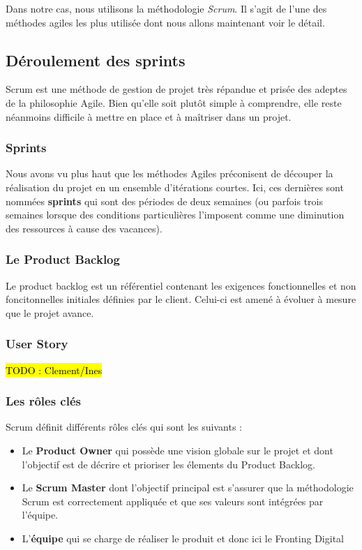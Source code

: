 	Dans notre cas, nous utilisons la méthodologie \textit{Scrum}. Il s'agit de l'une des méthodes agiles les plus utilisée dont nous allons maintenant voir le détail.

\subsection{Déroulement des sprints}

	Scrum est une méthode de gestion de projet très répandue et prisée des adeptes de la philosophie Agile. Bien qu'elle soit plutôt simple à comprendre, elle reste néanmoins difficile à mettre en place et à maîtriser dans un projet. \\
	
	\subsubsection{Sprints}
	Nous avons vu plus haut que les méthodes Agiles préconisent de découper la réalisation du projet en un ensemble d'itérations courtes. Ici, ces dernières sont nommées \textbf{sprints} qui sont des périodes de deux semaines (ou parfois trois semaines lorsque des conditions particulières l'imposent comme une diminution des ressources à cause des vacances).
	
	\subsubsection{Le Product Backlog}
	Le product backlog est un référentiel contenant les exigences fonctionnelles et non foncitonnelles initiales définies par le client. Celui-ci est amené à évoluer à mesure que le projet avance.
	
	\subsubsection{User Story}
	\hl{TODO : Clement/Ines}
	
	\subsubsection{Les rôles clés}
	Scrum définit différents rôles clés qui sont les suivants :
	\begin{itemize}
		\item Le \textbf{Product Owner} qui possède une vision globale sur le projet et dont l'objectif est de décrire et prioriser les élements du Product Backlog.
		\item Le \textbf{Scrum Master} dont l'objectif principal est s'assurer que la méthodologie Scrum est correctement appliquée et que ses valeurs sont intégrées par l'équipe.
		\item L'\textbf{équipe} qui se charge de réaliser le produit et donc ici le Fronting Digital
	\end{itemize}
	
